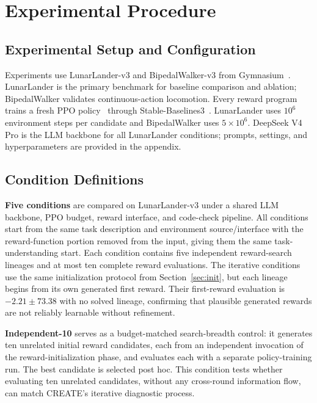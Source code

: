 \section{Experimental Procedure}
\label{sec:exp_procedure}

\subsection{Experimental Setup and Configuration}
\label{sec:exp_setup}

Experiments use LunarLander-v3 and BipedalWalker-v3 from Gymnasium~\cite{gymnasium}. LunarLander is the primary benchmark for baseline comparison and ablation; BipedalWalker validates continuous-action locomotion. Every reward program trains a fresh PPO policy~\cite{ppo} through Stable-Baselines3~\cite{sb3}. LunarLander uses $10^6$ environment steps per candidate and BipedalWalker uses $5\times10^6$. DeepSeek V4 Pro is the LLM backbone for all LunarLander conditions; prompts, settings, and hyperparameters are provided in the appendix.

\subsection{Condition Definitions}
\label{sec:conditions}

\textbf{Five conditions} are compared on LunarLander-v3 under a shared LLM backbone, PPO budget, reward interface, and code-check pipeline. All conditions start from the same task description and environment source/interface with the reward-function portion removed from the input, giving them the same task-understanding start. Each condition contains five independent reward-search lineages and at most ten complete reward evaluations. The iterative conditions use the same initialization protocol from Section~\ref{sec:init}, but each lineage begins from its own generated first reward. Their first-reward evaluation is $-2.21\pm73.38$ with no solved lineage, confirming that plausible generated rewards are not reliably learnable without refinement.

\textbf{Independent-10} serves as a budget-matched search-breadth control: it generates ten unrelated initial reward candidates, each from an independent invocation of the reward-initialization phase, and evaluates each with a separate policy-training run. The best candidate is selected post hoc. This condition tests whether evaluating ten unrelated candidates, without any cross-round information flow, can match CREATE's iterative diagnostic process.

